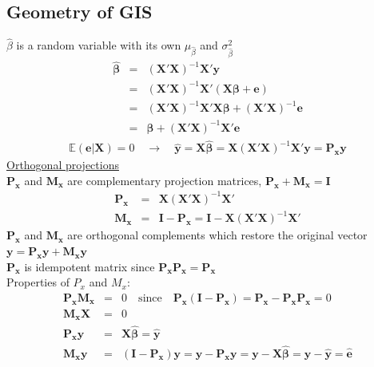 \subsection{Geometry of GIS}
$\hat{\beta}$ is a random variable with its own $\mu_{\hat{\beta}}$ and $\sigma^{2}_{\hat{\beta}}$
\begin{eqnarray*}
\boldsymbol{\hat{\beta}} &=& (\boldsymbol{X'X})^{-1}\boldsymbol{X'y}\\
&=& (\boldsymbol{X'X})^{-1}\boldsymbol{X'}(\boldsymbol{X\beta}+\boldsymbol{e})\\
&=& (\boldsymbol{X'X})^{-1}\boldsymbol{X'X\beta}+(\boldsymbol{X'X})^{-1}\boldsymbol{e}\\
&=& \boldsymbol{\beta}+(\boldsymbol{X'X})^{-1}\boldsymbol{X'e}
\end{eqnarray*}
\begin{eqnarray*}
\mathbb{E}(\boldsymbol{e}|\boldsymbol{X})=0\quad\to\quad\boldsymbol{\hat{y}}=\boldsymbol{X\hat{\beta}}=\boldsymbol{X}(\boldsymbol{X'X})^{-1}\boldsymbol{X'y}=\boldsymbol{P_{x}y}
\end{eqnarray*}
\underline{Orthogonal projections}\\
$\boldsymbol{P_{x}}$ and $\boldsymbol{M_{x}}$ are complementary projection matrices, $\boldsymbol{P_{x}}+\boldsymbol{M_{x}}=\boldsymbol{I}$
\begin{eqnarray*}
\boldsymbol{P_{x}} &=& \boldsymbol{X}(\boldsymbol{X'X})^{-1}\boldsymbol{X'}\\
\boldsymbol{M_{x}} &=& \boldsymbol{I}-\boldsymbol{P_{x}}=\boldsymbol{I}-\boldsymbol{X}(\boldsymbol{X'X})^{-1}\boldsymbol{X'}
\end{eqnarray*}
$\boldsymbol{P_{x}}$ and $\boldsymbol{M_{x}}$ are orthogonal complements which restore the original vector $\boldsymbol{y}=\boldsymbol{P_{x}y}+\boldsymbol{M_{x}y}$\\
$\boldsymbol{P_{x}}$ is idempotent matrix since $\boldsymbol{P_{x}P_{x}}=\boldsymbol{P_{x}}$\\
Properties of $P_{x}$ and $M_{x}$:
\begin{eqnarray*}
\boldsymbol{P_{x}M_{x}} &=& 0 \quad\text{since}\quad \boldsymbol{P_{x}}(\boldsymbol{I}-\boldsymbol{P_{x}})=\boldsymbol{P_{x}}-\boldsymbol{P_{x}P_{x}}=0\\
\boldsymbol{M_{x}X} &=& 0\\
\boldsymbol{P_{x}y} &=& \boldsymbol{X\hat{\beta}}=\boldsymbol{\hat{y}}\\
\boldsymbol{M_{x}y} &=& (\boldsymbol{I}-\boldsymbol{P_{x}})\boldsymbol{y}=\boldsymbol{y}-\boldsymbol{P_{x}y}=\boldsymbol{y}-\boldsymbol{X\hat{\beta}}=\boldsymbol{y}-\boldsymbol{\hat{y}}=\boldsymbol{\hat{e}}
\end{eqnarray*}
